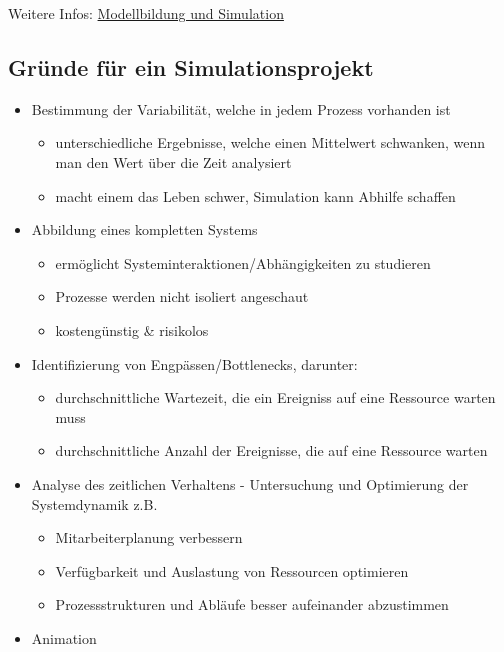 Weitere Infos: \href{https://pdfs.semanticscholar.org/d09e/bff3e7d0145b964fe31cdf31a119a8d7fca7.pdf}{Modellbildung und Simulation}

\subsection{Gründe für ein Simulationsprojekt}
\begin{itemize}
    \item Bestimmung der Variabilität, welche in jedem Prozess vorhanden ist
    \begin{itemize}
        \item unterschiedliche Ergebnisse, welche einen Mittelwert schwanken, wenn man den Wert über die Zeit analysiert 
        \item macht einem das Leben schwer, Simulation kann Abhilfe schaffen
    \end{itemize}
    \item Abbildung eines kompletten Systems 
    \begin{itemize}
        \item ermöglicht Systeminteraktionen/Abhängigkeiten zu studieren
        \item Prozesse werden nicht isoliert angeschaut
        \item kostengünstig \& risikolos
    \end{itemize}
    \item Identifizierung von Engpässen/Bottlenecks, darunter:
    \begin{itemize}
        \item durchschnittliche Wartezeit, die ein Ereigniss auf eine Ressource warten muss
        \item durchschnittliche Anzahl der Ereignisse, die auf eine Ressource warten
    \end{itemize}
    \item Analyse des zeitlichen Verhaltens - Untersuchung und Optimierung der Systemdynamik z.B.
    \begin{itemize}
        \item Mitarbeiterplanung verbessern
        \item Verfügbarkeit und Auslastung von Ressourcen optimieren
        \item Prozessstrukturen und Abläufe besser aufeinander abzustimmen
    \end{itemize}
    \item Animation
    \begin{itemize}

\end{itemize}
\end{itemize}
